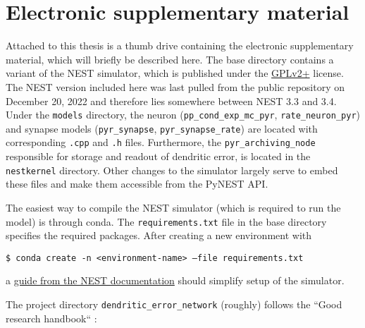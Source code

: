 \newpage
\section{Electronic supplementary material}

Attached to this thesis is a thumb drive containing the electronic supplementary material, which will briefly be
described here. The base directory contains a variant of the NEST simulator, which is published under the
\href{https://www.gnu.org/licenses/old-licenses/gpl-2.0.html}{GPLv2+} license. The NEST version included here was last
pulled from the public repository on December 20, 2022 and therefore lies somewhere between NEST 3.3 and 3.4. Under the
\texttt{models} directory, the neuron (\texttt{pp\_\allowbreak cond\_\allowbreak exp\_\allowbreak mc\_\allowbreak pyr},
\texttt{rate\_\allowbreak neuron\_\allowbreak pyr}) and synapse models (\texttt{pyr\_\allowbreak synapse},
\texttt{pyr\_\allowbreak synapse\_\allowbreak rate}) are located with corresponding \texttt{.cpp} and \texttt{.h} files.
Furthermore, the \texttt{pyr\_\allowbreak archiving\_\allowbreak node} responsible for storage and readout of dendritic
error, is located in the \texttt{nestkernel} directory. Other changes to the simulator largely serve to embed these
files and make them accessible from the PyNEST API.

The easiest way to compile the NEST simulator (which is required to run the model) is through conda. The
\texttt{requirements.txt} file in the base directory specifies the required packages. After creating a new environment
with\newline

\texttt{\$ conda create -n <environment-name> --file requirements.txt}\newline

a \href{https://nest-simulator.readthedocs.io/en/v3.4/installation/condaenv_install.html#condaenv}{guide from the NEST
documentation} should simplify setup of the simulator.

The project directory \texttt{dendritic\_\allowbreak error\_\allowbreak network} (roughly) follows the ``Good research
handbook`` \citep{Mineault2021}:

